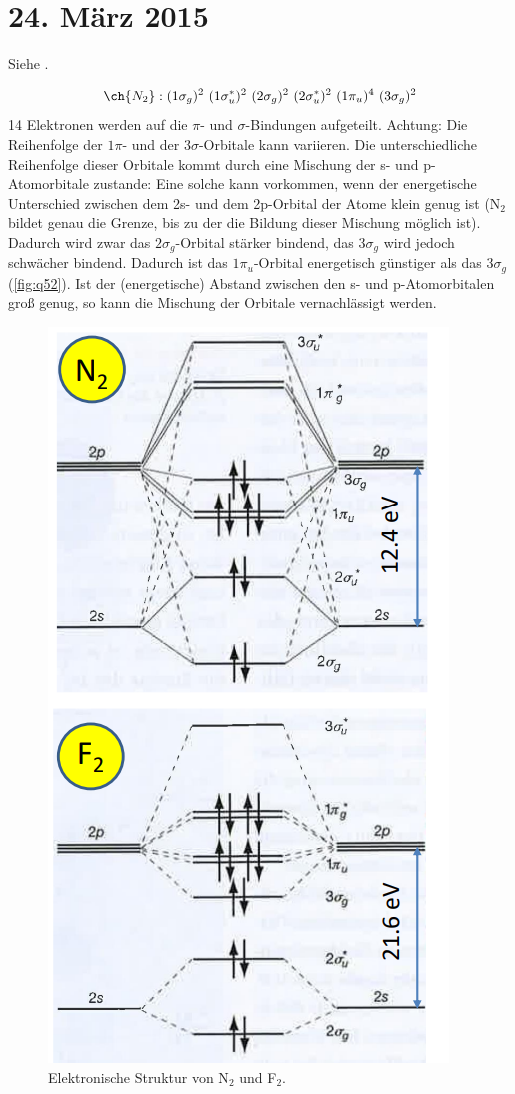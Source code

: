 \section{24. März 2015}

\label{q:51}

Siehe .

\label{q:52}

\[\ch{N_2} : (1\sigma_g)^2 ~ (1\sigma_u^*)^2 ~ (2\sigma_g)^2 ~ (2\sigma_u^*)^2 ~ (1\pi_u)^4 ~ (3\sigma_g)^2\]
14 Elektronen werden auf die $\pi$- und $\sigma$-Bindungen aufgeteilt. Achtung: Die Reihenfolge der $1\pi$- und der $3\sigma$-Orbitale kann variieren. Die unterschiedliche Reihenfolge dieser Orbitale kommt durch eine Mischung der s- und p-Atomorbitale zustande: Eine solche kann vorkommen, wenn der energetische Unterschied zwischen dem 2s- und dem 2p-Orbital der Atome klein genug ist (N$_2$ bildet genau die Grenze, bis zu der die Bildung dieser Mischung möglich ist). Dadurch wird zwar das $2\sigma_g$-Orbital stärker bindend, das $3\sigma_g$ wird jedoch schwächer bindend. Dadurch ist das $1\pi_u$-Orbital energetisch günstiger als das $3\sigma_g$ (\autoref{fig:q52}). Ist der (energetische) Abstand zwischen den s- und p-Atomorbitalen groß genug, so kann die Mischung der Orbitale vernachlässigt werden.

\begin{figure}[H]
    \centering
    \includegraphics[width=.4\textwidth]{resources/24-03-2015/N2-F2.png}
    \caption{Elektronische Struktur von N$_2$ und F$_2$.}
    \label{fig:q52}
\end{figure}


